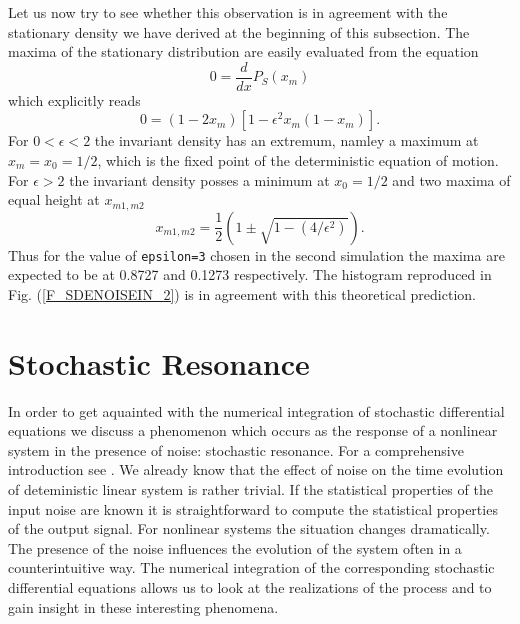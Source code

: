 Let us now try to see whether this observation is in agreement 
with the stationary density we have derived at the beginning of 
this subsection. The maxima of the stationary distribution are 
easily evaluated from the equation
\begin{equation*}
0 = \frac{d}{dx}P_S(x_m)
\end{equation*}
which explicitly reads
\begin{equation*}
0= (1-2x_m) [1- \epsilon^2 x_m (1-x_m) ].
\end{equation*}
For $0 < \epsilon <2$ the invariant density has an extremum, 
namley a maximum at $x_m =x_0= 1/2$, which is the fixed point of the 
deterministic equation of motion. For $\epsilon > 2$ the invariant
density posses a minimum at $x_0 =1/2$ and two maxima of equal 
height at $x_{m1,m2}$
\begin{equation*}
x_{m1,m2} = \frac{1}{2} \left(1 \pm  \sqrt{1 - (4/\epsilon^2)} 
\right).
\end{equation*}
Thus for the value of \texttt{epsilon=3} chosen in the second 
simulation the maxima are expected  to be at 0.8727 and 0.1273 
respectively. The histogram reproduced in Fig. (\ref{F_SDENOISEIN_2})
is in agreement with this theoretical prediction.


\section{Stochastic Resonance}
In order to get aquainted with 
the numerical integration of stochastic differential equations we discuss a
phenomenon which occurs as
the response of a nonlinear system in the presence of noise: stochastic 
resonance. For a comprehensive introduction see \cite{Lanzara,Bulsara}. 
We already know that the effect of noise on the time evolution of 
deteministic linear system is rather trivial. If the statistical properties of
the input noise are known it is straightforward to compute the statistical
properties of the output signal. For nonlinear systems the situation changes
dramatically. The presence of the noise influences the evolution of the
system often in a counterintuitive way. The numerical integration of the
corresponding stochastic differential equations allows us to look at the
realizations of the process and to gain insight in these interesting
phenomena. 

